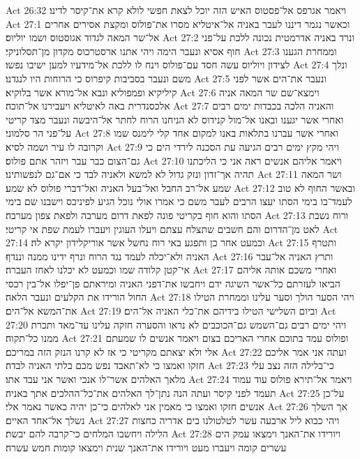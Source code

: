 Act 26:32  ויאמר אגרפס אל־פסטוס האיש הזה יוכל לצאת חפשי לולא קרא את־קיסר לדינו׃
Act 27:1  וכאשר נגמר דיננו לעבר באניה אל־איטליא מסרו את־פולוס ומקצת אסירים אחרים אל־שר המאה לגדוד אגוסטוס ושמו יוליוס׃
Act 27:2  ונרד באניה אדרמטית נכונה ללכת על־פני חוף אסיא ונעבר הימה ויהי אתנו ארסטרכוס מקדון מן־תסלוניקי׃
Act 27:3  וממחרת הגענו לצידון ויוליוס עשה חסד עם־פולוס וינח לו ללכת אל־מידעיו למען ישיבו נפשו׃
Act 27:4  ונלך משם ונעבר בסביבות קיפרוס כי הרוחות היו לנגדנו׃
Act 27:5  ונעבר את־הים אשר לפני קיליקיא ופמפוליא ונבא אל־מורא אשר בלוקיא׃
Act 27:6  וימצא־שם שר המאה אניה אלכסנדרית באה לאיטליא ויעבירנו אל־תוכה׃
Act 27:7  והאניה הלכה בכבדות ימים רבים ואחרי אשר יגענו ובאנו אל־מול קנידוס לא הניחנו הרוח לחתר אל־היבשה ונעבר מצד קריטי על־פני הר סלמוני׃
Act 27:8  ואחרי אשר עברנו בתלאות באנו למקום אחד קלי לימנס שמו וקרובה לו עיר ושמה לסיא׃
Act 27:9  ויהי מקץ ימים רבים הגיעה עת הסכנה לירדי הים כי גם־הצום כבר עבר ויזהר אתם פולוס׃
Act 27:10  ויאמר אליהם אנשים ראה אני כי הליכתנו תהיה אך־זדון ונזק גדול לא למשא ולאניה לבד כי אם־גם לנפשותינו׃
Act 27:11  ושר המאה שמע אל־רב החבל ואל־בעל האניה ואל־דברי פולוס לא שמע׃
Act 27:12  ובאשר החוף לא טוב לעמד־בו בימי הסתו יעצו הרבים לעבר משם כי אמרו אולי נוכל הגיע לפיניכס וישבנו שם בימי הסתו והוא חוף בקריטי פונה לפאת דרום מערבה ולפאת צפון מערבה׃
Act 27:13  ורוח נשבת לאט מן־הדרום והם חשבים שתצלח עצתם ויעלו העוגין ויעברו לעמת שפת אי קריטי׃
Act 27:14  וכמעט אחר כן ותפגע באי רוח נחשל אשר אוריקלידון יקרא לה׃
Act 27:15  ותטרף האניה ולא־יכלה לעמד נגד הרוח ונרף ידינו ממנה וננדף׃
Act 27:16  ותרץ האניה אל־עבר אי־קטן קלודה שמו וכמעט לא יכלנו לאחז העברה׃
Act 27:17  ואחרי משכם אותה אליהם הביאו לעזרתם כל־אשר השיגה ידם ויחבשו את־דפני האניה ומיראתם פן־יפלו אל־בין רכסי החול הורידו את הקלעים ונעבר הלאה׃
Act 27:18  ויהי הסער הולך וסער עלינו וממחרת הטילו את־המשא אל־הים׃
Act 27:19  וביום השלישי הטילו בידיהם את־כלי האניה אל־הים׃
Act 27:20  ויהי ימים רבים גם־השמש גם־הכוכבים לא נראו והסערה חזקה עלינו עד־מאד ותכרת ממנו כל־תקוה׃
Act 27:21  ופולוס עמד בתוכם אחרי האריכם בצום ויאמר אנשים לו שמעתם אלי ולא יצאתם מקריטי כי אז לא קרנו הנזק הזה במריכם׃
Act 27:22  ועתה אני אמר אליכם חזקו ואמצו כי לא־תאבד נפש מכם בלתי האניה לבדה׃
Act 27:23  כי־בלילה הזה נצב עלי מלאך האלהים אשר־לו אנכי ואשר אני עבד אתו׃
Act 27:24  ויאמר אל־תירא פולוס עוד עמוד תעמד לפני קיסר ועתה הנה נתן־לך האלהים את־כל־ההלכים אתך באניה׃
Act 27:25  על־כן אנשים חזקו ואמצו כי מאמין אני לאלהים כי־כן יהיה כאשר נאמר אלי׃
Act 27:26  אך השלך נשלך אל־אחד האיים׃
Act 27:27  ויהי כבוא ליל ארבעה עשר לטלטולנו בים אדריה כחצות הלילה ויחשבו המלחים כי־קרבה להם יבשת׃
Act 27:28  ויורידו את־האנך וימצאו עמק הים עשרים קומה ויעברו מעט ויורידו את־האנך שנית וימצאו קומות חמש עשרה׃
